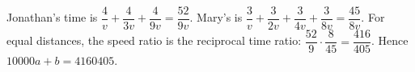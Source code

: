 Jonathan's time is $\dfrac{4}{v}+\dfrac{4}{3v}+\dfrac{4}{9v}=\dfrac{52}{9v}$. Mary's is $\dfrac{3}{v}+\dfrac{3}{2v}+\dfrac{3}{4v}+\dfrac{3}{8v}=\dfrac{45}{8v}$. For equal distances, the speed ratio is the reciprocal time ratio: $\dfrac{52}{9}\cdot\dfrac{8}{45}=\dfrac{416}{405}$. Hence $\boxed{10000a+b=4160405}$.
